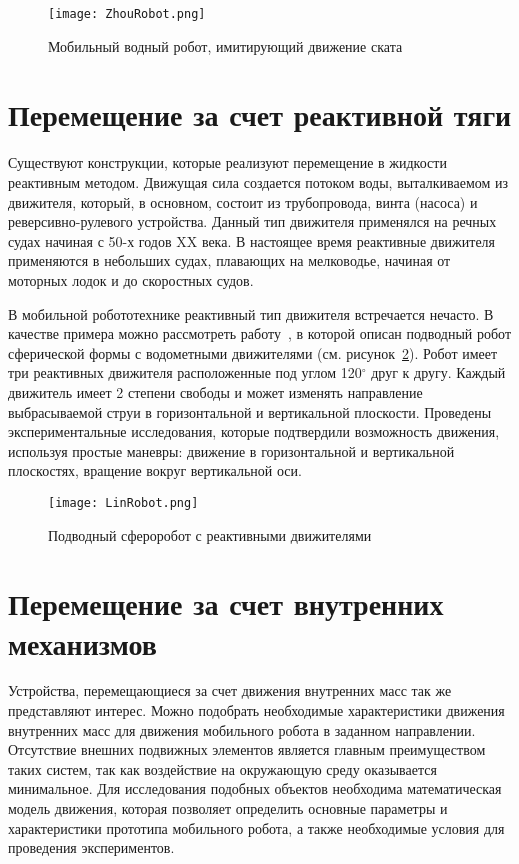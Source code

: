 \begin{figure}[h]
	\centering
	\texttt{[image: ZhouRobot.png]}%
	\caption{Мобильный водный робот, имитирующий движение ската}
	\label{ZhouRobot}
\end{figure}

\section{Перемещение за счет реактивной тяги}\label{sec:ch1/sec4}

Существуют конструкции, которые реализуют перемещение в жидкости реактивным методом. Движущая сила создается потоком воды, выталкиваемом из движителя, который, в основном, состоит из трубопровода, винта (насоса) и реверсивно-рулевого устройства. Данный тип движителя применялся на речных судах начиная с 50-х годов XX века. В настоящее время реактивные движителя применяются в небольших судах, плавающих на мелководье, начиная от моторных лодок и до скоростных судов.

В мобильной робототехнике реактивный тип движителя встречается нечасто. В качестве примера можно рассмотреть работу~\cite{Lin_2011}, в которой описан подводный робот сферической формы с водометными движителями (см. рисунок~\ref{LinRobot}). Робот имеет три реактивных движителя расположенные под углом 120$ ^\circ $ друг к другу. Каждый движитель имеет 2 степени свободы и может изменять направление выбрасываемой струи в горизонтальной и вертикальной плоскости. Проведены экспериментальные исследования, которые подтвердили возможность движения, используя простые маневры: движение в горизонтальной и вертикальной плоскостях, вращение вокруг вертикальной оси.

\begin{figure}[h]
	\centering
	\texttt{[image: LinRobot.png]}%
	\caption{Подводный сфероробот с реактивными движителями}
	\label{LinRobot}
\end{figure}

\section{Перемещение за счет внутренних механизмов}\label{sec:ch1/sec5}

Устройства, перемещающиеся за счет движения внутренних масс так же представляют интерес. Можно подобрать необходимые характеристики движения внутренних масс для движения мобильного робота в заданном направлении. Отсутствие внешних подвижных элементов является главным преимуществом таких систем, так как воздействие на окружающую среду оказывается минимальное. Для исследования подобных объектов необходима математическая модель движения, которая позволяет определить основные параметры и характеристики прототипа мобильного робота, а также необходимые условия для проведения экспериментов.

